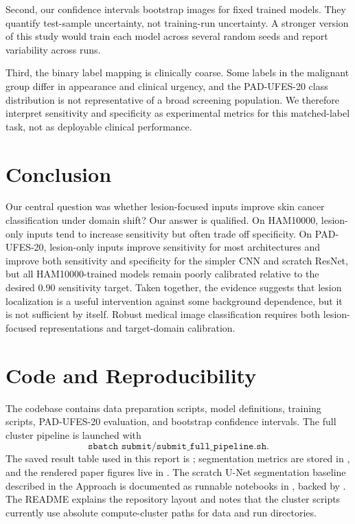 \documentclass[10pt]{article}
\begin{document}
Second, our confidence intervals bootstrap images for fixed trained models. They quantify test-sample uncertainty, not training-run uncertainty. A stronger version of this study would train each model across several random seeds and report variability across runs.

Third, the binary label mapping is clinically coarse. Some labels in the malignant group differ in appearance and clinical urgency, and the PAD-UFES-20 class distribution is not representative of a broad screening population. We therefore interpret sensitivity and specificity as experimental metrics for this matched-label task, not as deployable clinical performance.

\section{Conclusion}

Our central question was whether lesion-focused inputs improve skin cancer classification under domain shift? Our answer is qualified. On HAM10000, lesion-only inputs tend to increase sensitivity but often trade off specificity. On PAD-UFES-20, lesion-only inputs improve sensitivity for most architectures and improve both sensitivity and specificity for the simpler CNN and scratch ResNet, but all HAM10000-trained models remain poorly calibrated relative to the desired $0.90$ sensitivity target. Taken together, the evidence suggests that lesion localization is a useful intervention against some background dependence, but it is not sufficient by itself. Robust medical image classification requires both lesion-focused representations and target-domain calibration.

\section{Code and Reproducibility}

The codebase contains data preparation scripts, model definitions, training scripts, PAD-UFES-20 evaluation, and bootstrap confidence intervals. The full cluster pipeline is launched with
\[
\texttt{sbatch submit/submit\_full\_pipeline.sh}.
\]
The saved result table used in this report is ; segmentation metrics are stored in , and the rendered paper figures live in . The scratch U-Net segmentation baseline described in the Approach is documented as runnable notebooks in , backed by . The README explains the repository layout and notes that the cluster scripts currently use absolute compute-cluster paths for data and run directories.
\end{document}
